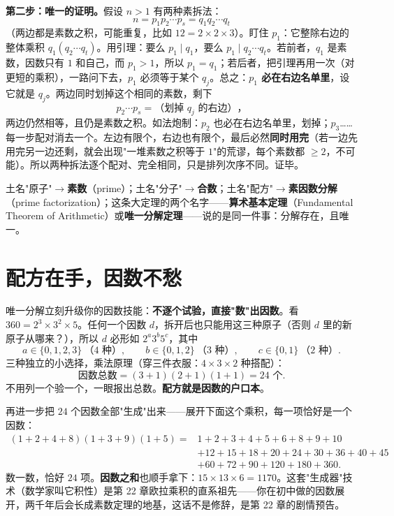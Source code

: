 \textbf{第二步：唯一的证明。}假设 $n > 1$ 有两种素拆法：
\[
n = p_1 p_2 \cdots p_s = q_1 q_2 \cdots q_t
\]
（两边都是素数之积，可能重复，比如 $12 = 2\times2\times3$）。盯住 $p_1$：它整除右边的整体乘积 $q_1(q_2\cdots q_t)$。用引理：要么 $p_1 \mid q_1$，要么 $p_1 \mid q_2\cdots q_t$。若前者，$q_1$ 是素数，因数只有 $1$ 和自己，而 $p_1 > 1$，所以 $p_1 = q_1$；若后者，把引理再用一次（对更短的乘积），一路问下去，$p_1$ 必须等于某个 $q_j$。总之：\textbf{$p_1$ 必在右边名单里}，设它就是 $q_j$。两边同时划掉这个相同的素数，剩下
\[
p_2\cdots p_s = \text{（划掉 } q_j \text{ 的右边）}，
\]
两边仍然相等，且仍是素数之积。如法炮制：$p_2$ 也必在右边名单里，划掉；$p_3$……每一步配对消去一个。左边有限个，右边也有限个，最后必然\textbf{同时用完}（若一边先用完另一边还剩，就会出现"一堆素数之积等于 $1$"的荒谬，每个素数都 $\ge 2$，不可能）。所以两种拆法逐个配对、完全相同，只是排列次序不同。证毕。

\begin{cidian}
土名"原子"$\to$\textbf{素数}（prime）；土名"分子"$\to$\textbf{合数}；土名"配方"$\to$\textbf{素因数分解}（prime factorization）；这条大定理的两个名字——\textbf{算术基本定理}（Fundamental Theorem of Arithmetic）或\textbf{唯一分解定理}——说的是同一件事：分解存在，且唯一。
\end{cidian}

\section{配方在手，因数不愁}

唯一分解立刻升级你的因数技能：\textbf{不逐个试验，直接"数"出因数}。看 $360 = 2^3\times 3^2\times 5$。任何一个因数 $d$，拆开后也只能用这三种原子（否则 $d$ 里的新原子从哪来？），所以 $d$ 必形如 $2^a 3^b 5^c$，其中
\[
a \in \{0,1,2,3\}\ \text{（4 种）},\qquad b \in \{0,1,2\}\ \text{（3 种）},\qquad c \in \{0,1\}\ \text{（2 种）}.
\]
三种独立的小选择，乘法原理（穿三件衣服：$4\times3\times2$ 种搭配）：
\[
\text{因数总数} = (3+1)(2+1)(1+1) = 24 \text{ 个}.
\]
不用列一个验一个，一眼报出总数。\textbf{配方就是因数的户口本}。

再进一步把 $24$ 个因数全部"生成"出来——展开下面这个乘积，每一项恰好是一个因数：
\begin{align*}
(1+2+4+8)(1+3+9)(1+5) = {}& 1+2+3+4+5+6+8+9+10 \\
& +12+15+18+20+24+30+36+40+45 \\
& +60+72+90+120+180+360 .
\end{align*}
数一数，恰好 $24$ 项。\textbf{因数之和}也顺手拿下：$15\times13\times6 = 1170$。这套"生成器"技术（数学家叫它积性）是第 22 章欧拉乘积的直系祖先——你在初中做的因数展开，两千年后会长成素数定理的地基，这话不是修辞，是第 22 章的剧情预告。

